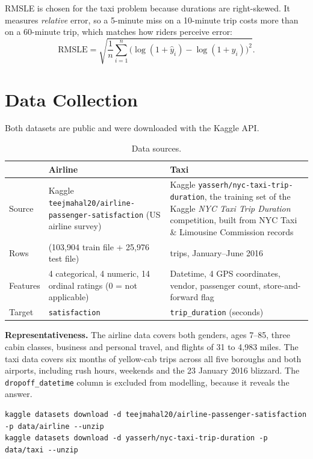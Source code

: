 \documentclass[11pt,a4paper]{article}
\begin{document}
\noindent RMSLE is chosen for the taxi problem because durations are right-skewed. It measures \emph{relative} error, so a 5-minute miss on a 10-minute trip costs more than on a 60-minute trip, which matches how riders perceive error:
\begin{equation}
\mathrm{RMSLE}=\sqrt{\frac{1}{n}\sum_{i=1}^{n}\bigl(\log(1+\hat y_i)-\log(1+y_i)\bigr)^2 }.
\end{equation}

\section{Data Collection}

Both datasets are public and were downloaded with the Kaggle API.

\begin{table}[H]\centering\small
\caption{Data sources.}
\begin{tabularx}{\textwidth}{@{}p{2.6cm}LL@{}}
\toprule
 & \textbf{Airline} & \textbf{Taxi} \\
\midrule
Source & Kaggle \nolinkurl{teejmahal20/airline-passenger-satisfaction} (US airline survey) & Kaggle \nolinkurl{yasserh/nyc-taxi-trip-duration}, the training set of the Kaggle \emph{NYC Taxi Trip Duration} competition, built from NYC Taxi \& Limousine Commission records \\
Rows & \airRows{} (103{,}904 train file + 25{,}976 test file) & \taxiRows{} trips, January--June 2016 \\
Features & 4 categorical, 4 numeric, 14 ordinal ratings (0 = not applicable) & Datetime, 4 GPS coordinates, vendor, passenger count, store-and-forward flag \\
Target & \texttt{satisfaction} & \texttt{trip\_duration} (seconds) \\
\bottomrule
\end{tabularx}
\end{table}

\noindent\textbf{Representativeness.} The airline data covers both genders, ages 7--85, three cabin classes, business and personal travel, and flights of 31 to 4{,}983 miles. The taxi data covers six months of yellow-cab trips across all five boroughs and both airports, including rush hours, weekends and the 23 January 2016 blizzard. The \texttt{dropoff\_datetime} column is excluded from modelling, because it reveals the answer.

\begin{lstlisting}
kaggle datasets download -d teejmahal20/airline-passenger-satisfaction -p data/airline --unzip
kaggle datasets download -d yasserh/nyc-taxi-trip-duration -p data/taxi --unzip
\end{lstlisting}
\end{document}
